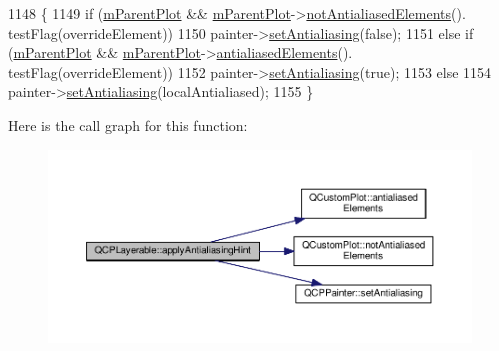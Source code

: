 \begin{DoxyCode}
1148 \{
1149   \textcolor{keywordflow}{if} (\hyperlink{class_q_c_p_layerable_aa2a528433e44db02b8aef23c1f9f90ed}{mParentPlot} && \hyperlink{class_q_c_p_layerable_aa2a528433e44db02b8aef23c1f9f90ed}{mParentPlot}->\hyperlink{class_q_custom_plot_a8060cee59757213764382a78d3196189}{notAntialiasedElements}().
      testFlag(overrideElement))
1150     painter->\hyperlink{class_q_c_p_painter_aaba1deb9188244d9ea65b035112b4d05}{setAntialiasing}(\textcolor{keyword}{false});
1151   \textcolor{keywordflow}{else} \textcolor{keywordflow}{if} (\hyperlink{class_q_c_p_layerable_aa2a528433e44db02b8aef23c1f9f90ed}{mParentPlot} && \hyperlink{class_q_c_p_layerable_aa2a528433e44db02b8aef23c1f9f90ed}{mParentPlot}->\hyperlink{class_q_custom_plot_a81e954fbb485bb44c609e5707f0067b3}{antialiasedElements}().
      testFlag(overrideElement))
1152     painter->\hyperlink{class_q_c_p_painter_aaba1deb9188244d9ea65b035112b4d05}{setAntialiasing}(\textcolor{keyword}{true});
1153   \textcolor{keywordflow}{else}
1154     painter->\hyperlink{class_q_c_p_painter_aaba1deb9188244d9ea65b035112b4d05}{setAntialiasing}(localAntialiased);
1155 \}
\end{DoxyCode}


Here is the call graph for this function\+:\nopagebreak
\begin{figure}[H]
\begin{center}
\leavevmode
\includegraphics[width=350pt]{class_q_c_p_layerable_a62bd552d1a45aa9accb24b310542279e_cgraph}
\end{center}
\end{figure}




